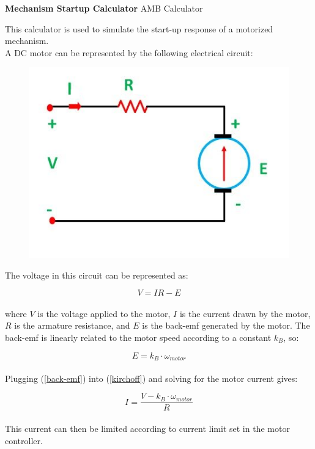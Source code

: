 \documentclass[a4paper]{article}
\begin{document}
	
	\Huge\textbf{Mechanism Startup Calculator}
	\newline
	\LARGE AMB Calculator
	
	\vspace{0.5cm}
	\normalsize
	
	This calculator is used to simulate the start-up response of a motorized mechanism.\\
	
	A DC motor can be represented by the following electrical circuit:
	
	\begin{figure}[H]
		\centering
		\includegraphics[width=0.7\linewidth]{dc_motor.png}
	\end{figure}
	
	The voltage in this circuit can be represented as:
	
	\begin{equation} \label{kirchoff}
		V = I R - E
	\end{equation}
	\\
	where $ V $ is the voltage applied to the motor, $ I $ is the current drawn by the motor, $ R $ is the armature resistance, and $ E $ is the back-emf generated by the motor. The back-emf is linearly related to the motor speed according to a constant $ k_B $, so:
	
	\begin{equation} \label{back-emf}
		E = k_B \cdot \omega_{motor}
	\end{equation}
	\\
	Plugging (\ref{back-emf}) into (\ref{kirchoff}) and solving for the motor current gives:
	
	\begin{equation}
		I = \frac{V - k_B \cdot \omega_{motor}}{R}
	\end{equation}
	\\
	This current can then be limited according to current limit set in the motor controller.\\
	
\end{document}
